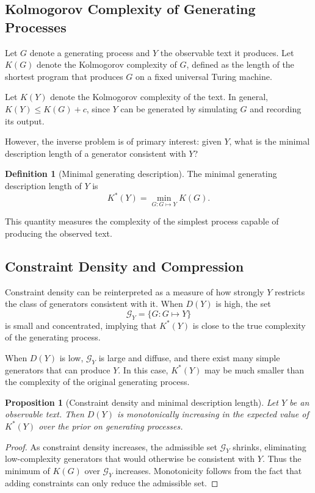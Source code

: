 \documentclass[12pt, oneside]{article}
\theoremstyle{plain}
\newtheorem{proposition}[theorem]{Proposition}
\theoremstyle{definition}
\newtheorem{definition}[theorem]{Definition}
\theoremstyle{remark}
\begin{document}
\subsection{Kolmogorov Complexity of Generating Processes}

Let $G$ denote a generating process and $Y$ the observable text it produces. Let
$K(G)$ denote the Kolmogorov complexity of $G$, defined as the length of the shortest
program that produces $G$ on a fixed universal Turing machine.

Let $K(Y)$ denote the Kolmogorov complexity of the text. In general, $K(Y) \leq K(G) + c$,
since $Y$ can be generated by simulating $G$ and recording its output.

However, the inverse problem is of primary interest: given $Y$, what is the minimal
description length of a generator consistent with $Y$?

\begin{definition}[Minimal generating description]
The minimal generating description length of $Y$ is
\[
  K^*(Y) = \min_{G : G \mapsto Y} K(G).
\]
\end{definition}

This quantity measures the complexity of the simplest process capable of producing
the observed text.

\subsection{Constraint Density and Compression}

Constraint density can be reinterpreted as a measure of how strongly $Y$ restricts
the class of generators consistent with it. When $D(Y)$ is high, the set
\[
  \mathcal{G}_Y = \{ G : G \mapsto Y \}
\]
is small and concentrated, implying that $K^*(Y)$ is close to the true complexity
of the generating process.

When $D(Y)$ is low, $\mathcal{G}_Y$ is large and diffuse, and there exist many
simple generators that can produce $Y$. In this case, $K^*(Y)$ may be much smaller
than the complexity of the original generating process.

\begin{proposition}[Constraint density and minimal description length]
Let $Y$ be an observable text. Then $D(Y)$ is monotonically increasing in the
expected value of $K^*(Y)$ over the prior on generating processes.
\end{proposition}

\begin{proof}
As constraint density increases, the admissible set $\mathcal{G}_Y$ shrinks,
eliminating low-complexity generators that would otherwise be consistent with $Y$.
Thus the minimum of $K(G)$ over $\mathcal{G}_Y$ increases. Monotonicity follows
from the fact that adding constraints can only reduce the admissible set.
\end{proof}
\end{document}

